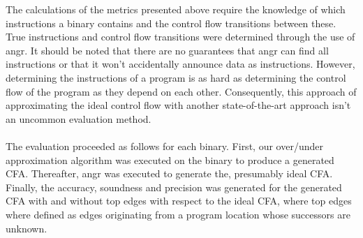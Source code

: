 \documentclass{kththesis}
\begin{document}
The calculations of the metrics presented above require the knowledge of which instructions a binary contains and the control flow transitions between these. True instructions and control flow transitions were determined through the use of angr. It should be noted that there are no guarantees that angr can find all instructions or that it won't accidentally announce data as instructions. However, determining the instructions of a program is as hard as determining the control flow of the program as they depend on each other. Consequently, this approach of approximating the ideal control flow with another state-of-the-art approach isn't an uncommon evaluation method\cite{preciseCFG}\cite{alternating}.
\\ \\
The evaluation proceeded as follows for each binary. First, our over/under approximation algorithm was executed on the binary to produce a generated CFA. Thereafter, angr was executed to generate the, presumably ideal CFA. Finally, the accuracy, soundness and precision was generated for the generated CFA with and without top edges with respect to the ideal CFA, where top edges where defined as edges originating from a program location whose successors are unknown.

\end{document}
